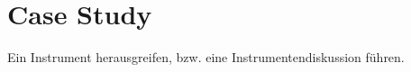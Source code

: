 \documentclass[
onecolumn,
a4paper,
abstracton,
parskip=half
,final
]{scrartcl}
\begin{document}
\clearpage




\section{Case Study}
\label{sec1:caseStudy}
Ein Instrument herausgreifen, bzw. eine Instrumentendiskussion f{\"u}hren.

\subsection{}
\subsection{}
\subsection{}



\clearpage


\vspace{10pt}
\singlespacing

\newpage


%
\end{document}
